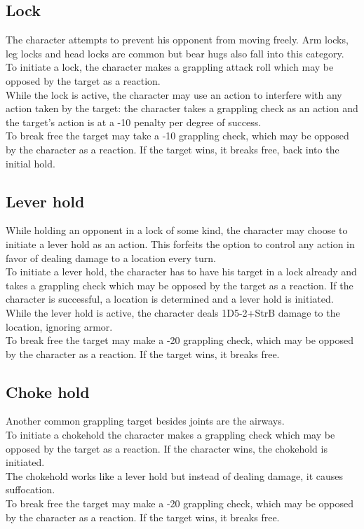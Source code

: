 \documentclass[12pt,a4paper]{book}
\begin{document}
	\subsection*{Lock}
	The character attempts to prevent his opponent from moving freely. Arm locks, leg locks and head locks are common but bear hugs also fall into this category.\\
	To initiate a lock, the character makes a grappling attack roll which may be opposed by the target as a reaction.\\
	While the lock is active, the character may use an action to interfere with any action taken by the target: the character takes a grappling check as an action and the target’s action is at a -10 penalty per degree of success.\\
	To break free the target may take a -10 grappling check, which may be opposed by the character as a reaction. If the target wins, it breaks free, back into the initial hold.
	\subsection*{Lever hold}
	While holding an opponent in a lock of some kind, the character may choose to initiate a lever hold as an action. This forfeits the option to control any action in favor of dealing damage to a location every turn.\\
	To initiate a lever hold, the character has to have his target in a lock already and takes a grappling check which may be opposed by the target as a reaction. If the character is successful, a location is determined and a lever hold is initiated.\\
	While the lever hold is active, the character deals 1D5-2+StrB damage to the location, ignoring armor.\\
	To break free the target may make a -20 grappling check, which may be opposed by the character as a reaction. If the target wins, it breaks free.
	\subsection*{Choke hold}
	Another common grappling target besides joints are the airways.\\
	To initiate a chokehold the character makes a grappling check which may be opposed by the target as a reaction. If the character wins, the chokehold is initiated.\\
	The chokehold works like a lever hold but instead of dealing damage, it causes suffocation.\\
	To break free the target may make a -20 grappling check, which may be opposed by the character as a reaction. If the target wins, it breaks free.
\end{document}
